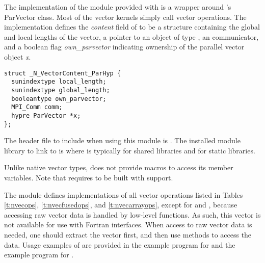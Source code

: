 %
The {\nvecph} implementation of the {\nvector} module provided with
{\sundials} is a wrapper around {\hypre}'s ParVector class. 
Most of the vector kernels simply call {\hypre} vector operations. 
The implementation defines the {\em content} field of  to 
be a structure containing the global and local lengths of the vector, a 
pointer to an object of type , an {\mpi} communicator, 
and a boolean flag {\em own\_parvector} indicating ownership of the
{\hypre} parallel vector object {\em x}.
\begin{verbatim}
struct _N_VectorContent_ParHyp {
  sunindextype local_length;
  sunindextype global_length;
  booleantype own_parvector;
  MPI_Comm comm;
  hypre_ParVector *x;
};
\end{verbatim}
The header file to include when using this module is .
The installed module library to link to is
where  is typically  for shared libraries and 
for static libraries.

Unlike native {\sundials} vector types, {\nvecph} does not provide macros 
to access its member variables.
Note that {\nvecph} requires {\sundials} to be built with {\mpi} support.

The {\nvecph} module defines implementations of all vector operations 
listed in Tables \ref{t:nvecops}, \ref{t:nvecfusedops}, and \ref{t:nvecarrayops}, except
for  and , because accessing raw vector
data is handled by low-level {\hypre} functions.
As such, this vector is not available for use with {\sundials} Fortran interfaces.
When access to raw vector data is needed, one
should extract the {\hypre} vector first, and then use {\hypre}
methods to access the data. Usage examples of {\nvecph} are provided in
the  example program for {\cvode} \cite{cvode_ex}
and the  example program for {\arkode} \cite{arkode_ex}.

